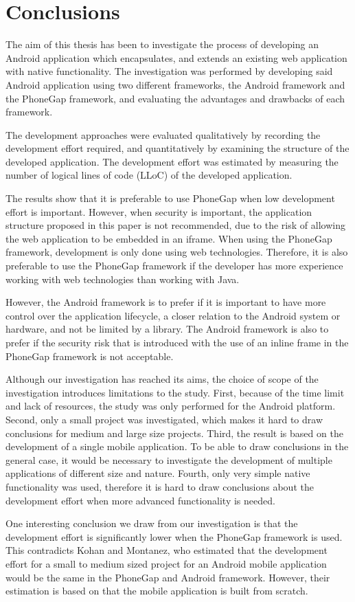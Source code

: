 \chapter{Conclusions} \label{ch:conclusions}
The aim of this thesis has been to investigate the process of developing an Android application which encapsulates, and extends an existing web application with native functionality. The investigation was performed by developing said Android application using two different frameworks, the Android framework and the PhoneGap framework, and evaluating the advantages and drawbacks of each framework.

The development approaches were evaluated qualitatively by recording the development effort required, and quantitatively by examining the structure of the developed application. The development effort was estimated by measuring the number of logical lines of code (LLoC) of the developed application.

The results show that it is preferable to use PhoneGap when low development effort is important. However, when security is important, the application structure proposed in this paper is not recommended, due to the risk of allowing the web application to be embedded in an iframe.
When using the PhoneGap framework, development is only done using web technologies. Therefore, it is also preferable to use the PhoneGap framework if the developer has more experience working with web technologies than working with Java. 

However, the Android framework is to prefer if it is important to have more control over the application lifecycle, a closer relation to the Android system or hardware, and not be limited by a library. The Android framework is also to prefer if the security risk that is introduced with the use of an inline frame in the PhoneGap framework is not acceptable.

Although our investigation has reached its aims, the choice of scope of the investigation introduces limitations to the study. 
First, because of the time limit and lack of resources, the study was only performed for the Android platform. 
Second, only a small project was investigated, which makes it hard to draw conclusions for medium and large size projects. 
Third, the result is based on the development of a single mobile application. To be able to draw conclusions in the general case, it would be necessary to investigate the development of multiple applications of different size and nature. 
Fourth, only very simple native functionality was used, therefore it is hard to draw conclusions about the development effort when more advanced functionality is needed.

One interesting conclusion we draw from our investigation is that the development effort is significantly lower when the PhoneGap framework is used. This contradicts Kohan and Montanez, who estimated that the development effort for a small to medium sized project for an Android mobile application would be the same in the PhoneGap and Android framework. However, their estimation is based on that the mobile application is built from scratch.
